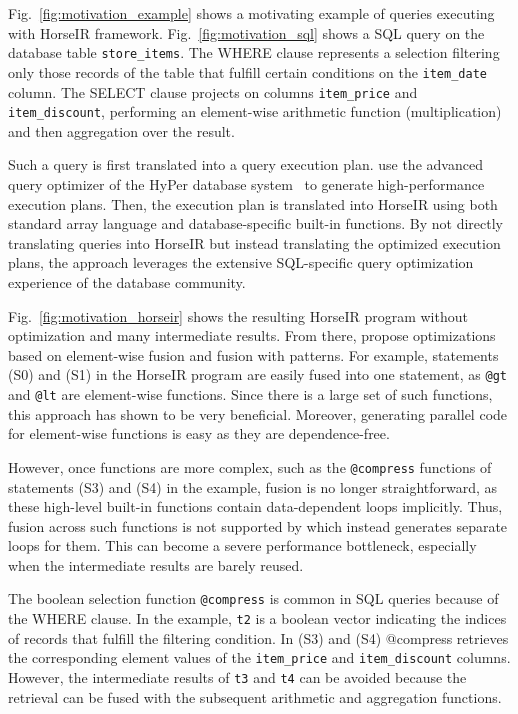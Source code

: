 

Fig.~\ref{fig:motivation_example} shows a motivating example of queries
executing with HorseIR framework. Fig.~\ref{fig:motivation_sql} shows a SQL
query on the database table \texttt{store\_items}. The WHERE clause represents
a selection filtering only those records of the table that fulfill certain
conditions on the \texttt{item_date} column. The SELECT clause projects on
columns \texttt{item_price} and \texttt{item\_discount}, performing an
element-wise arithmetic function (multiplication) and then aggregation over the
result. 

Such a query is first translated into a query execution plan. 
\OldPaperAuthor use the advanced query optimizer of the HyPer database
system~\cite{Neumann2011:HyPer} to generate high-performance execution plans.
Then, the execution plan is translated into HorseIR using both standard array
language and database-specific built-in functions. By not directly translating
queries into HorseIR but instead translating the optimized execution plans, the
approach leverages the extensive SQL-specific query optimization experience of
the database community.

Fig.~\ref{fig:motivation_horseir} shows the resulting HorseIR program without
optimization and many intermediate results. From there, \OldPaperAuthor propose
optimizations based on element-wise fusion and fusion
with patterns. For example, statements (S0) and (S1) in the HorseIR program are easily
fused into one statement, as \texttt{@gt} and \texttt{@lt} are element-wise
functions. Since there is a large set of such functions, this approach has
shown to be very beneficial. 
Moreover, generating parallel code for element-wise functions is easy as they
are dependence-free.


However, once functions are more complex, such as the \texttt{@compress}
functions of statements (S3) and (S4) in the example, fusion is no longer
straightforward, as these high-level built-in functions contain data-dependent
loops implicitly. 
Thus, fusion across such functions is not supported by 
\OldPaper which instead generates separate loops for them.
This can become a severe performance bottleneck, especially when the
intermediate results are barely reused. 

The boolean selection function \texttt{@compress} is common in SQL queries
because of the WHERE clause.
In the example, \texttt{t2} is a boolean vector indicating the indices of
records that fulfill the filtering condition. In (S3) and (S4)
@compress retrieves the corresponding element values of the
\texttt{item\_price} and \texttt{item\_discount} columns.
However, the intermediate results of \texttt{t3} and \texttt{t4} can be avoided
because the retrieval can be fused with the subsequent arithmetic and
aggregation functions. 

